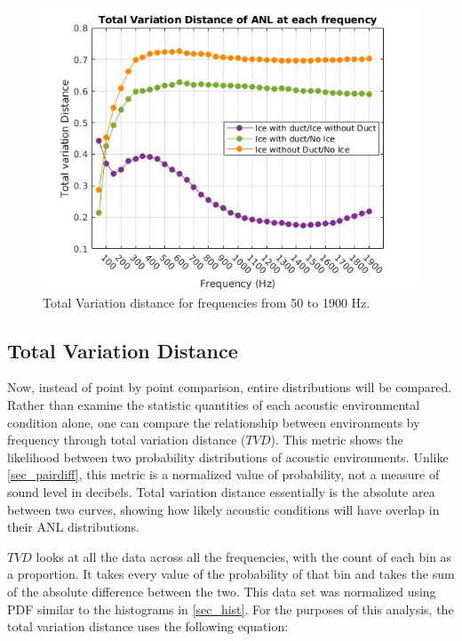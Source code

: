 \begin{figure}[p]
\centering
\includegraphics[scale=0.62]{Figures/recolor_total_var_dist_norm_pdf.jpg}
\caption{Total Variation distance for frequencies from 50 to 1900 Hz.}
\label{fig_totvardist}
\end{figure}

\subsection{Total Variation Distance} \label{sec_$TVD$}

Now, instead of point by point comparison, entire distributions will be compared. Rather than examine the statistic quantities of each acoustic environmental condition alone, one can compare the relationship between environments by frequency through total variation distance ($TVD$). This metric shows the likelihood between two probability distributions of acoustic environments. Unlike \autoref{sec_pairdiff}, this metric is a normalized value of probability, not a measure of sound level in decibels. Total variation distance essentially is the absolute area between two curves, showing how likely acoustic conditions will have overlap in their ANL distributions. 

 $TVD$ looks at all the data across all the frequencies, with the count of each bin as a proportion. It takes every value of the probability of that bin and takes the sum of the absolute difference between the two. This data set was normalized using PDF similar to the histograms in \autoref{sec_hist}. For the purposes of this analysis, the total variation distance uses the following equation: 

